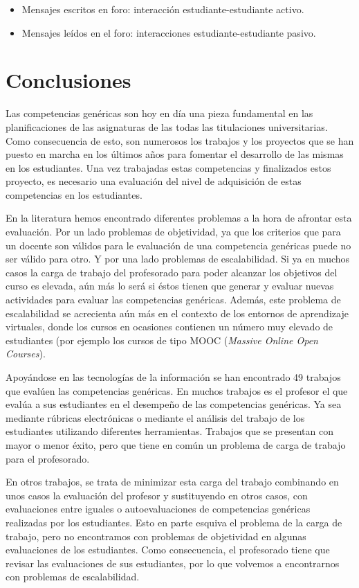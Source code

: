 \begin{itemize}
\item Mensajes escritos en foro: interacción estudiante-estudiante activo.
\item Mensajes leídos en el foro:  interacciones estudiante-estudiante pasivo.
\end{itemize}

\section{Conclusiones}

Las competencias genéricas son hoy en día una pieza fundamental en las planificaciones de las asignaturas de las todas las titulaciones universitarias. Como consecuencia de esto, son numerosos los trabajos y los proyectos que se han puesto en marcha en los últimos años para fomentar el desarrollo de las mismas en los estudiantes. Una vez trabajadas estas competencias y finalizados estos proyecto, es necesario una evaluación del nivel de adquisición de estas competencias en los estudiantes.

En la literatura hemos encontrado diferentes problemas a la hora de afrontar esta evaluación. Por un lado problemas de objetividad, ya que los criterios que para un docente son válidos para le evaluación de una competencia genéricas puede no ser válido para otro. Y por una lado problemas de escalabilidad. Si ya en muchos casos la carga de trabajo del profesorado para poder alcanzar los objetivos del curso es elevada, aún más lo será si éstos tienen que generar y evaluar nuevas actividades para evaluar las competencias genéricas. Además, este problema de escalabilidad se acrecienta aún más en el contexto de los entornos de aprendizaje virtuales, donde los cursos en ocasiones contienen un número muy elevado de estudiantes (por ejemplo los cursos de tipo MOOC (\emph{Massive Online Open Courses}).

Apoyándose en las tecnologías de la información se han encontrado 49 trabajos que evalúen las competencias genéricas. En muchos trabajos es el profesor el que evalúa a sus estudiantes en el desempeño de las competencias genéricas. Ya sea mediante rúbricas electrónicas o mediante el análisis del trabajo de los estudiantes utilizando diferentes herramientas. Trabajos que se presentan con mayor o menor éxito, pero que tiene en común un problema de carga de trabajo para el profesorado.

En otros trabajos, se trata de minimizar esta carga del trabajo combinando en unos casos la evaluación del profesor y sustituyendo en otros casos, con evaluaciones entre iguales o autoevaluaciones de competencias genéricas realizadas por los estudiantes. Esto en parte esquiva el problema de la carga de trabajo, pero no encontramos con problemas de objetividad en algunas evaluaciones de los estudiantes. Como consecuencia, el profesorado tiene que revisar las evaluaciones de sus estudiantes, por lo que volvemos a encontrarnos con problemas de escalabilidad.

